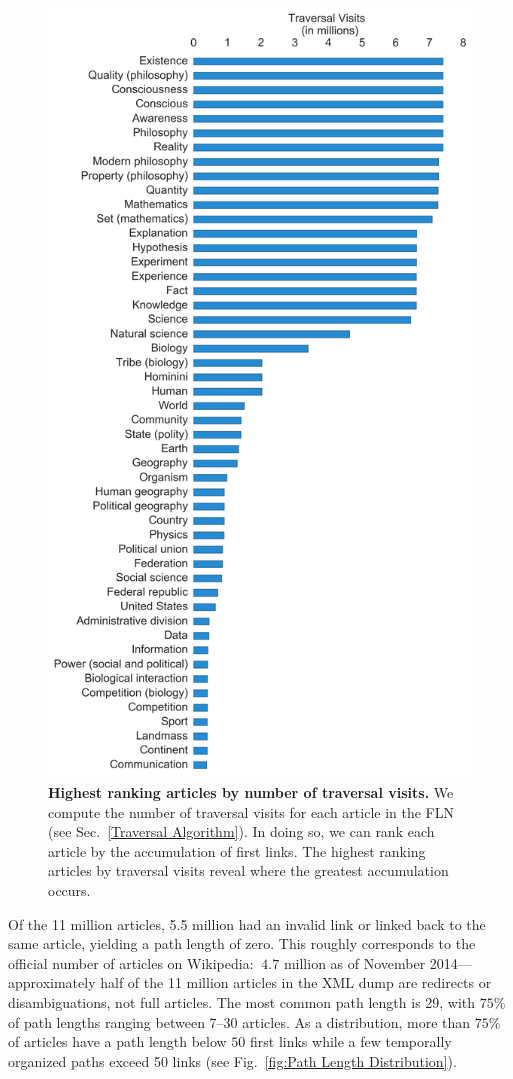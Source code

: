\documentclass[pre,twocolumn,twoside,superscriptaddress,floatfix]{revtex4-1}
\begin{document}
{\begin{figure}[tp!]
  \includegraphics[width=\columnwidth]{articles_ranked.pdf}
  \caption{
    \textbf{Highest ranking articles by number of traversal visits.}
We compute the number of traversal visits for each article in the FLN (see 
Sec.~\ref{Traversal Algorithm}). 
In doing so, we can rank each article by the accumulation of first links.
The highest ranking articles by traversal visits reveal where the greatest accumulation occurs.}
  \label{fig:highest visits}
\end{figure}
Of the 11 million articles, 5.5 million had an invalid link or linked back to the same article, yielding a path length of zero. 
This roughly corresponds to the official number of articles on Wikipedia: 
$~4.7$ million as of November 2014---approximately half of the 11 million 
articles in the XML dump are redirects or disambiguations, not full articles.
The most common path length is 29, with $75\%$ of path lengths ranging between 7--30 articles.
As a distribution, more than $75\%$ of articles have a path length below 
$50$ first links 
while a few temporally organized paths exceed 50 links 
(see Fig.~\ref{fig:Path Length Distribution}). 

}
\end{document}
